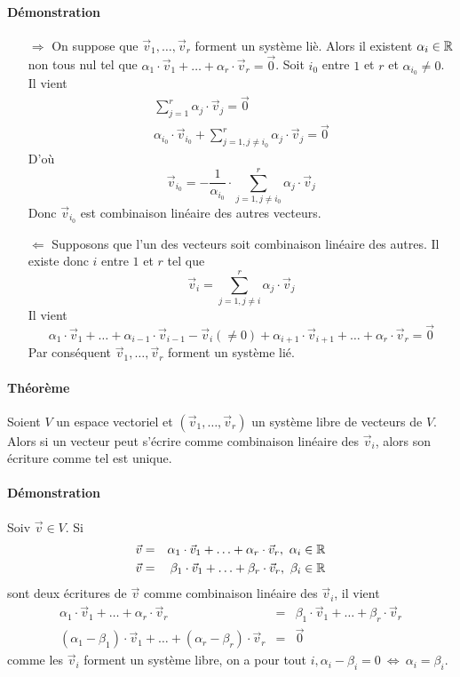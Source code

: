 \paragraph{Démonstration} 
\begin{itemize}
  \item[$\Rightarrow$] On suppose que $\vec{v}_1, \ldots, \vec{v}_r$ forment un système liè. Alors il existent $\alpha_i \in \mathbb{R}$ non tous nul tel que $\alpha_1 \cdot \vec{v}_1 + \ldots + \alpha_r \cdot \vec{v}_r = \vec{0}$. Soit $i_0$ entre $1$ et $r$ et $\alpha_{i_0} \neq 0$. Il vient
    \begin{eqnarray*}
      \sum_{j=1}^{r} \alpha_j \cdot \vec{v}_j = \vec{0} \\
      \alpha_{i_0} \cdot \vec{v}_{i_0} + \sum_{j=1, j \neq i_0}^{r} \alpha_j \cdot \vec{v}_j = \vec{0}
    \end{eqnarray*}
    D'où
    $$\vec{v}_{i_0} = -\frac{1}{\alpha_{i_0}} \cdot \sum_{j=1, j \neq i_0}^{r} \alpha_j \cdot \vec{v}_j$$
    Donc $\vec{v}_{i_0}$ est combinaison linéaire des autres vecteurs.
  
  \item[$\Leftarrow$] Supposons que l'un des vecteurs soit combinaison linéaire des autres. Il existe donc $i$ entre $1$ et $r$ tel que 
    $$\vec{v}_i = \sum_{j=1, j \neq i}^{r} \alpha_j \cdot \vec{v}_j$$
    Il vient 
    $$\alpha_1 \cdot \vec{v}_1 + \ldots + \alpha_{i-1} \cdot \vec{v}_{i-1} - \vec{v}_i (\neq 0) + \alpha_{i+1} \cdot \vec{v}_{i+1} + \ldots + \alpha_r \cdot \vec{v}_r = \vec{0}$$
    Par conséquent $\vec{v}_1, \ldots, \vec{v}_r$ forment un système lié.
\end{itemize}

\paragraph*{Théorème} Soient $V$ un espace vectoriel et $(\vec{v}_1, \ldots, \vec{v}_r)$ un système libre de vecteurs de $V$. Alors si un vecteur peut s'écrire comme combinaison linéaire des $\vec{v}_i$, alors son écriture comme tel est unique.

\paragraph{Démonstration} Soiv $\vec{v} \in V$. Si 
\begin{eqnarray*}
  \vec{v} &=& \alpha_1 \cdot \vec{v}_1 + \ldots + \alpha_r \cdot \vec{v}_r, ~ \alpha_i \in \mathbb{R} \\
  \vec{v} &=& \beta_1 \cdot \vec{v}_1 + \ldots + \beta_r \cdot \vec{v}_r, ~ \beta_i \in \mathbb{R} 
\end{eqnarray*}
sont deux écritures de $\vec{v}$ comme combinaison linéaire des $\vec{v}_i$, il vient
\begin{eqnarray*}
  \alpha_1 \cdot \vec{v}_1 + \ldots + \alpha_r \cdot \vec{v}_r &=& \beta_1 \cdot \vec{v}_1 + \ldots + \beta_r \cdot \vec{v}_r \\
  (\alpha_1 - \beta_1) \cdot \vec{v}_1 + \ldots + (\alpha_r - \beta_r) \cdot \vec{v}_r &=& \vec{0}
\end{eqnarray*}
comme les $\vec{v}_i$ forment un système libre, on a pour tout $i, \alpha_i - \beta_i = 0 ~\Leftrightarrow~ \alpha_i = \beta_i$.

